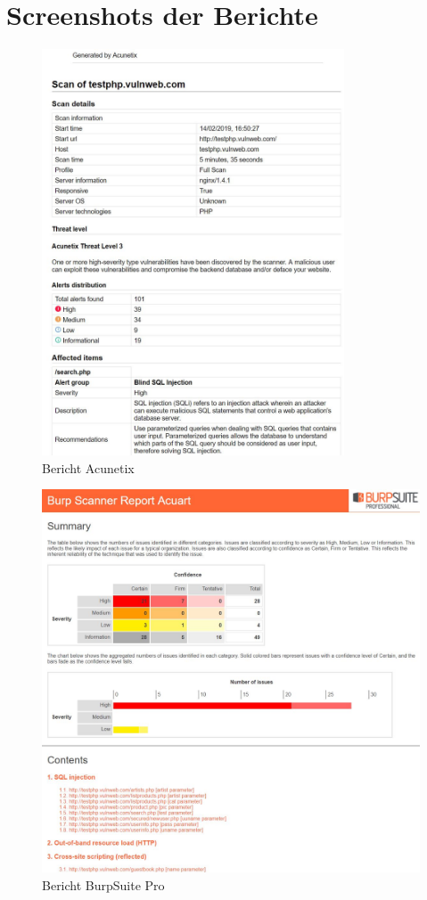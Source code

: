 \documentclass[12pt,oneside,a4paper,parskip,pointlessnumbers]{scrbook}
\begin{document}
  \chapter{Screenshots der Berichte}
  \begin{figure}[htb!]
    \centering
      \includegraphics[width=0.8\textwidth]{Images/ScrAcunetix}
    \caption[Bericht Acunetix]{Bericht Acunetix}
  \end{figure}
  \begin{figure}[htb!]
    \centering
      \includegraphics[width=1.051\textwidth]{Images/ScrBurp}
    \caption[Bericht BurpSuite Pro]{Bericht BurpSuite Pro}
  \end{figure}
\end{document}

